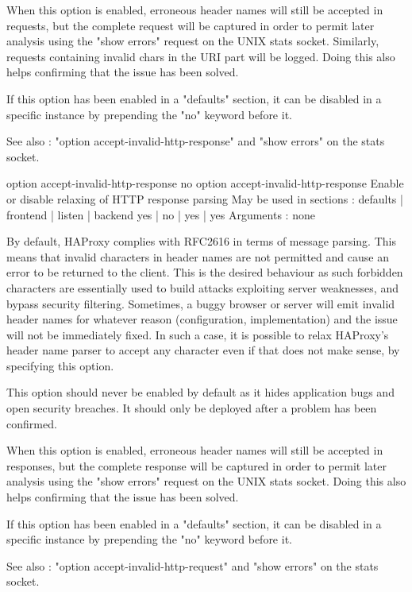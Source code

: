   When this option is enabled, erroneous header names will still be accepted in
  requests, but the complete request will be captured in order to permit later
  analysis using the "show errors" request on the UNIX stats socket. Similarly,
  requests containing invalid chars in the URI part will be logged. Doing this
  also helps confirming that the issue has been solved.

  If this option has been enabled in a "defaults" section, it can be disabled
  in a specific instance by prepending the "no" keyword before it.

  See also : "option accept-invalid-http-response" and "show errors" on the
             stats socket.


option accept-invalid-http-response
no option accept-invalid-http-response
  Enable or disable relaxing of HTTP response parsing
  May be used in sections :   defaults | frontend | listen | backend
                                 yes   |     no   |   yes  |   yes
  Arguments : none

  By default, HAProxy complies with RFC2616 in terms of message parsing. This
  means that invalid characters in header names are not permitted and cause an
  error to be returned to the client. This is the desired behaviour as such
  forbidden characters are essentially used to build attacks exploiting server
  weaknesses, and bypass security filtering. Sometimes, a buggy browser or
  server will emit invalid header names for whatever reason (configuration,
  implementation) and the issue will not be immediately fixed. In such a case,
  it is possible to relax HAProxy's header name parser to accept any character
  even if that does not make sense, by specifying this option.

  This option should never be enabled by default as it hides application bugs
  and open security breaches. It should only be deployed after a problem has
  been confirmed.

  When this option is enabled, erroneous header names will still be accepted in
  responses, but the complete response will be captured in order to permit
  later analysis using the "show errors" request on the UNIX stats socket.
  Doing this also helps confirming that the issue has been solved.

  If this option has been enabled in a "defaults" section, it can be disabled
  in a specific instance by prepending the "no" keyword before it.

  See also : "option accept-invalid-http-request" and "show errors" on the
             stats socket.


